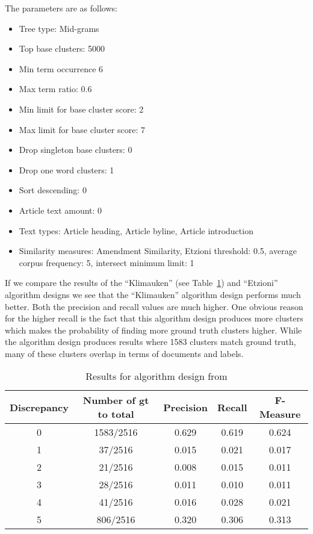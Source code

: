 The parameters are as follows:
\begin{itemize}
  \item Tree type: Mid-grams
  \item Top base clusters: 5000
  \item Min term occurrence 6
  \item Max term ratio: 0.6
  \item Min limit for base cluster score: 2
  \item Max limit for base cluster score: 7
  \item Drop singleton base clusters: 0
  \item Drop one word clusters: 1
  \item Sort descending: 0
  \item Article text amount: 0
  \item Text types: Article heading, Article byline, Article introduction
  \item Similarity measures: Amendment Similarity, Etzioni threshold: 0.5, average corpus frequency: 5, intersect minimum limit: 1
\end{itemize}

If we compare the results of the ``Klimauken'' (see Table~\ref{tab:klimaukenparametersgroundtruth}) and ``Etzioni'' algorithm designs we see that the ``Klimauken'' algorithm design performs much better. Both the precision and recall values are much higher. One obvious reason for the higher recall is the fact that this algorithm design produces more clusters which makes the probability of finding more ground truth clusters higher. While the algorithm design produces results where 1583 clusters match ground truth, many of these clusters overlap in terms of documents and labels.

\begin{table}[H]
\begin{center}
\begin{tabular}{|c|c|ccc|}
\hline
Discrepancy & Number of gt to total & Precision & Recall & F-Measure\\ 
\hline
0&   1583/2516&   0.629&   0.619 & 0.624\\ 
1&   37/2516&   0.015&   0.021&    0.017\\ 
2&   21/2516&   0.008&   0.015&    0.011\\ 
3&   28/2516&   0.011&   0.010&    0.011\\ 
4&   41/2516&   0.016&   0.028&    0.021\\ 
5&   806/2516&    0.320&   0.306&    0.313\\ 
\hline
\end{tabular}
\end{center}
\caption{Results for algorithm design from \citeauthor{Moe2013compact}}
\label{tab:klimaukenparametersgroundtruth}
\end{table}

